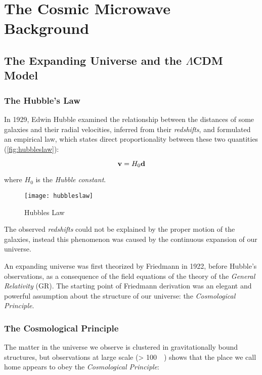 \chapter{The Cosmic Microwave Background}\label{ch:cmb}

\section{The Expanding Universe and the \texorpdfstring{$\Lambda$}{LAMBDA-}CDM Model}
\subsection{The Hubble's Law}\label{ss:hubbleslaw}

In 1929, Edwin Hubble examined the relationship between the distances of
some galaxies and their radial velocities, inferred from their \emph{redshifts},
and formulated an empirical law, which states direct proportionality
between these two quantities (\autoref{fig:hubbleslaw}):

\begin{equation}\label{eq:hubble_law}
        \vb{v} = H_0 \vb{d}
\end{equation}

where $H_0$ is the \emph{Hubble constant}.

\begin{figure}
        \centering
        \texttt{[image: hubbleslaw]}
        \caption{Hubbles Law}
        \label{fig:hubbleslaw}
\end{figure}

The observed \emph{redshifts} could not be explained by the proper motion of
the galaxies, instead this phenomenon was caused by the continuous expansion
of our universe.

An expanding universe was first theorized by Friedmann in 1922, before Hubble's
observations, as a consequence of the field equations of the theory of the
\emph{General Relativity} (GR). The starting point of Friedmann derivation was
an elegant and powerful assumption about the structure of our universe:
the \emph{Cosmological Principle}.

\subsection{The Cosmological Principle}\label{ss:cosmological_principle}

The matter in the universe we observe is clustered in gravitationally bound
structures, but observations at large scale (\SI{> 100}{\mega\parsec}) shows
that the place we call home appears to obey the \emph{Cosmological
Principle}:

